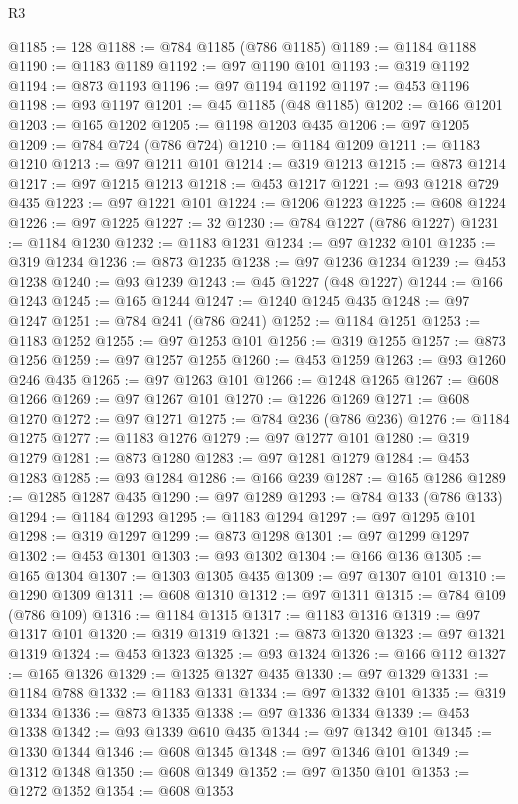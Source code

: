 \begin{lexlean}{R3}
\begin{coremodule}
@1185 := 128
@1188 := @784 @1185 (@786 @1185)
@1189 := @1184 @1188
@1190 := @1183 @1189
@1192 := @97 @1190 @101
@1193 := @319 @1192
@1194 := @873 @1193
@1196 := @97 @1194 @1192
@1197 := @453 @1196
@1198 := @93 @1197
@1201 := @45 @1185 (@48 @1185)
@1202 := @166 @1201
@1203 := @165 @1202
@1205 := @1198 @1203 @435
@1206 := @97 @1205
@1209 := @784 @724 (@786 @724)
@1210 := @1184 @1209
@1211 := @1183 @1210
@1213 := @97 @1211 @101
@1214 := @319 @1213
@1215 := @873 @1214
@1217 := @97 @1215 @1213
@1218 := @453 @1217
@1221 := @93 @1218 @729 @435
@1223 := @97 @1221 @101
@1224 := @1206 @1223
@1225 := @608 @1224
@1226 := @97 @1225
@1227 := 32
@1230 := @784 @1227 (@786 @1227)
@1231 := @1184 @1230
@1232 := @1183 @1231
@1234 := @97 @1232 @101
@1235 := @319 @1234
@1236 := @873 @1235
@1238 := @97 @1236 @1234
@1239 := @453 @1238
@1240 := @93 @1239
@1243 := @45 @1227 (@48 @1227)
@1244 := @166 @1243
@1245 := @165 @1244
@1247 := @1240 @1245 @435
@1248 := @97 @1247
@1251 := @784 @241 (@786 @241)
@1252 := @1184 @1251
@1253 := @1183 @1252
@1255 := @97 @1253 @101
@1256 := @319 @1255
@1257 := @873 @1256
@1259 := @97 @1257 @1255
@1260 := @453 @1259
@1263 := @93 @1260 @246 @435
@1265 := @97 @1263 @101
@1266 := @1248 @1265
@1267 := @608 @1266
@1269 := @97 @1267 @101
@1270 := @1226 @1269
@1271 := @608 @1270
@1272 := @97 @1271
@1275 := @784 @236 (@786 @236)
@1276 := @1184 @1275
@1277 := @1183 @1276
@1279 := @97 @1277 @101
@1280 := @319 @1279
@1281 := @873 @1280
@1283 := @97 @1281 @1279
@1284 := @453 @1283
@1285 := @93 @1284
@1286 := @166 @239
@1287 := @165 @1286
@1289 := @1285 @1287 @435
@1290 := @97 @1289
@1293 := @784 @133 (@786 @133)
@1294 := @1184 @1293
@1295 := @1183 @1294
@1297 := @97 @1295 @101
@1298 := @319 @1297
@1299 := @873 @1298
@1301 := @97 @1299 @1297
@1302 := @453 @1301
@1303 := @93 @1302
@1304 := @166 @136
@1305 := @165 @1304
@1307 := @1303 @1305 @435
@1309 := @97 @1307 @101
@1310 := @1290 @1309
@1311 := @608 @1310
@1312 := @97 @1311
@1315 := @784 @109 (@786 @109)
@1316 := @1184 @1315
@1317 := @1183 @1316
@1319 := @97 @1317 @101
@1320 := @319 @1319
@1321 := @873 @1320
@1323 := @97 @1321 @1319
@1324 := @453 @1323
@1325 := @93 @1324
@1326 := @166 @112
@1327 := @165 @1326
@1329 := @1325 @1327 @435
@1330 := @97 @1329
@1331 := @1184 @788
@1332 := @1183 @1331
@1334 := @97 @1332 @101
@1335 := @319 @1334
@1336 := @873 @1335
@1338 := @97 @1336 @1334
@1339 := @453 @1338
@1342 := @93 @1339 @610 @435
@1344 := @97 @1342 @101
@1345 := @1330 @1344
@1346 := @608 @1345
@1348 := @97 @1346 @101
@1349 := @1312 @1348
@1350 := @608 @1349
@1352 := @97 @1350 @101
@1353 := @1272 @1352
@1354 := @608 @1353

\end{coremodule}
\end{lexlean}
